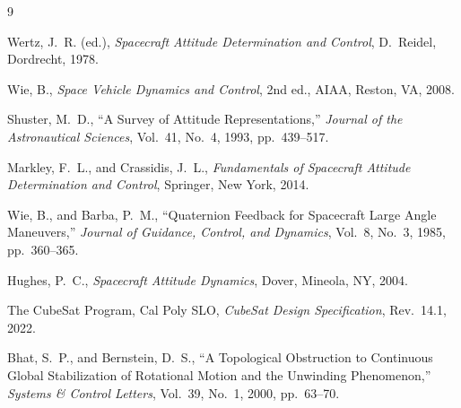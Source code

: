 \documentclass[letterpaper,10pt]{article}
\begin{document}
\begin{thebibliography}{9}
\setlength{\itemsep}{0pt}
\small

Wertz, J.~R. (ed.), \textit{Spacecraft Attitude Determination and Control},
D.~Reidel, Dordrecht, 1978.

Wie, B., \textit{Space Vehicle Dynamics and Control}, 2nd ed., AIAA,
Reston, VA, 2008.

Shuster, M.~D., ``A Survey of Attitude Representations,''
\textit{Journal of the Astronautical Sciences}, Vol.~41, No.~4, 1993,
pp.~439--517.

Markley, F.~L., and Crassidis, J.~L., \textit{Fundamentals of Spacecraft
Attitude Determination and Control}, Springer, New York, 2014.

Wie, B., and Barba, P.~M., ``Quaternion Feedback for Spacecraft Large Angle
Maneuvers,'' \textit{Journal of Guidance, Control, and Dynamics}, Vol.~8,
No.~3, 1985, pp.~360--365.

Hughes, P.~C., \textit{Spacecraft Attitude Dynamics}, Dover, Mineola, NY,
2004.

The CubeSat Program, Cal Poly SLO, \textit{CubeSat Design Specification},
Rev.~14.1, 2022.

Bhat, S.~P., and Bernstein, D.~S., ``A Topological Obstruction to Continuous
Global Stabilization of Rotational Motion and the Unwinding Phenomenon,''
\textit{Systems \& Control Letters}, Vol.~39, No.~1, 2000, pp.~63--70.

\end{thebibliography}
\end{document}
